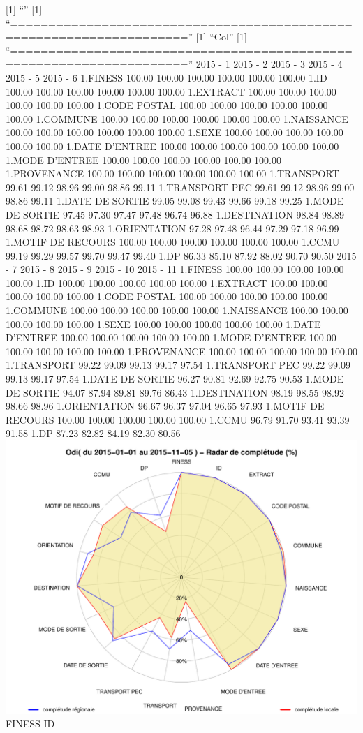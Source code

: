 \documentclass[]{article}
\begin{document}
{[}1{]} ``'' {[}1{]}
``=====================================================================''
{[}1{]} ``Col'' {[}1{]}
``=====================================================================''
2015 - 1 2015 - 2 2015 - 3 2015 - 4 2015 - 5 2015 - 6 1.FINESS 100.00
100.00 100.00 100.00 100.00 100.00 1.ID 100.00 100.00 100.00 100.00
100.00 100.00 1.EXTRACT 100.00 100.00 100.00 100.00 100.00 100.00 1.CODE
POSTAL 100.00 100.00 100.00 100.00 100.00 100.00 1.COMMUNE 100.00 100.00
100.00 100.00 100.00 100.00 1.NAISSANCE 100.00 100.00 100.00 100.00
100.00 100.00 1.SEXE 100.00 100.00 100.00 100.00 100.00 100.00 1.DATE
D'ENTREE 100.00 100.00 100.00 100.00 100.00 100.00 1.MODE D'ENTREE
100.00 100.00 100.00 100.00 100.00 100.00 1.PROVENANCE 100.00 100.00
100.00 100.00 100.00 100.00 1.TRANSPORT 99.61 99.12 98.96 99.00 98.86
99.11 1.TRANSPORT PEC 99.61 99.12 98.96 99.00 98.86 99.11 1.DATE DE
SORTIE 99.05 99.08 99.43 99.66 99.18 99.25 1.MODE DE SORTIE 97.45 97.30
97.47 97.48 96.74 96.88 1.DESTINATION 98.84 98.89 98.68 98.72 98.63
98.93 1.ORIENTATION 97.28 97.48 96.44 97.29 97.18 96.99 1.MOTIF DE
RECOURS 100.00 100.00 100.00 100.00 100.00 100.00 1.CCMU 99.19 99.29
99.57 99.70 99.47 99.40 1.DP 86.33 85.10 87.92 88.02 90.70 90.50 2015 -
7 2015 - 8 2015 - 9 2015 - 10 2015 - 11 1.FINESS 100.00 100.00 100.00
100.00 100.00 1.ID 100.00 100.00 100.00 100.00 100.00 1.EXTRACT 100.00
100.00 100.00 100.00 100.00 1.CODE POSTAL 100.00 100.00 100.00 100.00
100.00 1.COMMUNE 100.00 100.00 100.00 100.00 100.00 1.NAISSANCE 100.00
100.00 100.00 100.00 100.00 1.SEXE 100.00 100.00 100.00 100.00 100.00
1.DATE D'ENTREE 100.00 100.00 100.00 100.00 100.00 1.MODE D'ENTREE
100.00 100.00 100.00 100.00 100.00 1.PROVENANCE 100.00 100.00 100.00
100.00 100.00 1.TRANSPORT 99.22 99.09 99.13 99.17 97.54 1.TRANSPORT PEC
99.22 99.09 99.13 99.17 97.54 1.DATE DE SORTIE 96.27 90.81 92.69 92.75
90.53 1.MODE DE SORTIE 94.07 87.94 89.81 89.76 86.43 1.DESTINATION 98.19
98.55 98.92 98.66 98.96 1.ORIENTATION 96.67 96.37 97.04 96.65 97.93
1.MOTIF DE RECOURS 100.00 100.00 100.00 100.00 100.00 1.CCMU 96.79 91.70
93.41 93.39 91.58 1.DP 87.23 82.82 84.19 82.30 80.56
\includegraphics{completude_files/figure-latex/finess-13.pdf} FINESS ID
\end{document}
